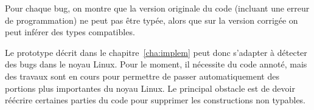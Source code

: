 Pour chaque bug, on montre que la version originale du code (incluant une erreur
de programmation) ne peut pas être typée, alors que sur la version corrigée on
peut inférer des types compatibles.

Le prototype décrit dans le chapitre~\ref{cha:implem} peut donc s'adapter à
détecter des bugs dans le noyau Linux. Pour le moment, il nécessite du code
annoté, mais des travaux sont en cours pour permettre de passer automatiquement
des portions plus importantes du noyau Linux. Le principal obstacle est de
devoir réécrire certaines parties du code pour supprimer les constructions non
typables.

